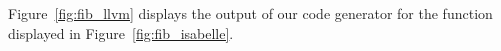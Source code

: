 \documentclass[a4paper,oribibl,envcountsame]{llncs}
\begin{document}
% 
%   
%   
% 
% 

\begin{example}
Figure~\ref{fig:fib_llvm} displays the output of our code generator for the  function displayed in Figure~\ref{fig:fib_isabelle}.
\end{example}
\end{document}
